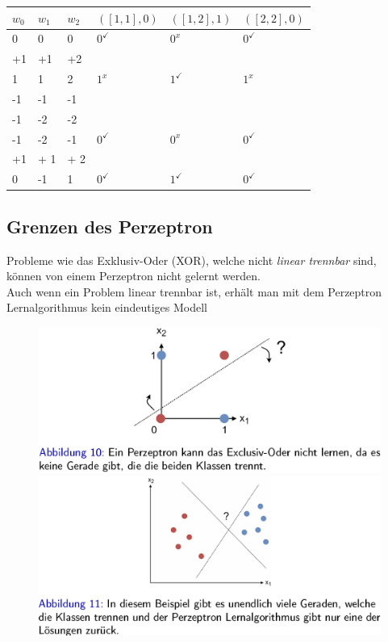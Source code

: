 \documentclass{report}
\begin{document}
  \begin{tabular}{l|l|l|l|l|l}	
    $w_0$ & $w_1$ & $w_2$ & $([1, 1], 0)$ & $([1, 2], 1)$ & $([2, 2], 0)$\\	
    \hline
    0 & 0 & 0 & $0^{\checkmark}$ & $0^{x}$ & $0^{\checkmark}$\\	
    +1 & +1 & +2 & & &\\	
    \hline	
    1 & 1 & 2 & $1^x$ & $1^{\checkmark}$ & $1^x$\\	
    -1 & -1 & -1 & & &\\	
    -1 & -2 & -2 & & &\\	
    \hline	
    -1 & -2 & -1 & $0^{\checkmark}$ & $0^x$ & $0^{\checkmark}$\\	
    +1 & + 1 & + 2 & & &\\	
    \hline	
    0 & -1 & 1 & $0^{\checkmark}$ & $1^{\checkmark}$ & $0^{\checkmark}$	
  \end{tabular}
  \subsection{Grenzen des Perzeptron}
  Probleme wie das Exklusiv-Oder (XOR), welche nicht \textit{linear trennbar} sind, können von einem Perzeptron nicht gelernt werden.\\	
  Auch wenn ein Problem linear trennbar ist, erhält man mit dem Perzeptron Lernalgorithmus kein eindeutiges Modell
  \begin{figure}[H]
    \centering
    \begin{minipage}[b]{0.4\textwidth}
      \includegraphics[scale=.25]{ml04_9}
    \end{minipage}
    \hfill
    \begin{minipage}[b]{0.4\textwidth}
      \includegraphics[scale=.25]{ml04_10}	
    \end{minipage}
  \end{figure}	
  
\end{document}
